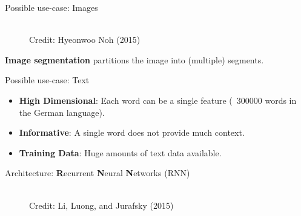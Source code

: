 \begin{frame} {Possible use-case: Images}
\begin{figure}
\centering
{}
\\
\tiny{Credit: Hyeonwoo Noh (2015)} 
\end{figure}
\textbf{Image segmentation} partitions the image into (multiple) segments.
\end{frame}

\begin{frame} {Possible use-case: Text}
\begin{itemize}
\item \textbf{High Dimensional}: Each word can be a single feature (~300000 words in the German language).
\vspace{.1cm}
\item \textbf{Informative}: A single word does not provide much context.
\vspace{.1cm}
\item \textbf{Training Data}: Huge amounts of text data available.
\end{itemize}
\vspace{.3cm}
Architecture: \textbf{R}ecurrent \textbf{N}eural \textbf{N}etworks (RNN)
\begin{figure}
\centering
{}
\\
\tiny{Credit: Li, Luong, and Jurafsky (2015)} 
\end{figure}
\end{frame}

